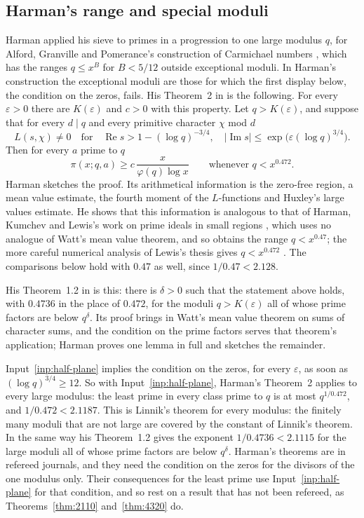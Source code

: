 \documentclass[11pt]{article}
\theoremstyle{definition}
\begin{document}
\subsection*{Harman's range and special moduli}

Harman \cite{harman05, harman08} applied his sieve to primes in a progression to one large modulus $q$, for Alford,
Granville and Pomerance's construction of Carmichael numbers \cite{agp}, which has the ranges $q \le x^B$ for
$B < 5/12$ outside exceptional moduli. In Harman's construction the exceptional moduli are those for which the
first display below, the condition on the zeros, fails. His Theorem~2 in \cite{harman05} is the following. For every
$\varepsilon > 0$ there are $K(\varepsilon)$ and $c > 0$ with this property. Let $q > K(\varepsilon)$, and suppose
that for every $d \mid q$ and every primitive character $\chi$ mod $d$
\[
  L(s, \chi) \ne 0 \quad \text{for} \quad \operatorname{Re} s > 1 - (\log q)^{-3/4}, \quad
  |\operatorname{Im} s| \le \exp\bigl(\varepsilon (\log q)^{3/4}\bigr).
\]
Then for every $a$ prime to $q$
\[
  \pi(x; q, a) \ge c\, \frac{x}{\varphi(q) \log x} \qquad \text{whenever } q < x^{0.472}.
\]
Harman sketches the proof. Its arithmetical information is the zero-free region, a mean value estimate, the fourth
moment of the $L$-functions and Huxley's large values estimate. He shows that this information is analogous to that
of Harman, Kumchev and Lewis's work on prime ideals in small regions \cite{hkl}, which uses no analogue of Watt's
mean value theorem, and so obtains the range $q < x^{0.47}$; the more careful numerical analysis of Lewis's thesis
\cite{lewis-thesis} gives $q < x^{0.472}$ \cite[p.~646]{harman05}. The comparisons below hold with $0.47$ as well,
since $1/0.47 < 2.128$.

His Theorem~1.2 in \cite{harman08} is this: there is $\delta > 0$ such that the statement above holds, with $0.4736$
in the place of $0.472$, for the moduli $q > K(\varepsilon)$ all of whose prime factors are below $q^\delta$. Its
proof brings in Watt's mean value theorem on sums of character sums, and the condition on the prime factors serves
that theorem's application; Harman proves one lemma in full and sketches the remainder.

Input~\ref{inp:half-plane} implies the condition on the zeros, for every $\varepsilon$, as soon as
$(\log q)^{3/4} \ge 12$. So with Input~\ref{inp:half-plane}, Harman's Theorem~2 applies to every large modulus: the
least prime in every class prime to $q$ is at most $q^{1/0.472}$, and $1/0.472 < 2.1187$. This is Linnik's theorem
for every modulus: the finitely many moduli that are not large are covered by the constant of Linnik's theorem. In
the same way his Theorem~1.2 gives the exponent $1/0.4736 < 2.1115$ for the large moduli all of whose prime factors
are below $q^\delta$. Harman's theorems are in refereed journals, and they need the condition on the zeros for the
divisors of the one modulus only. Their consequences for the least prime use Input~\ref{inp:half-plane} for that
condition, and so rest on a result that has not been refereed, as Theorems~\ref{thm:2110} and~\ref{thm:4320} do.
\end{document}
